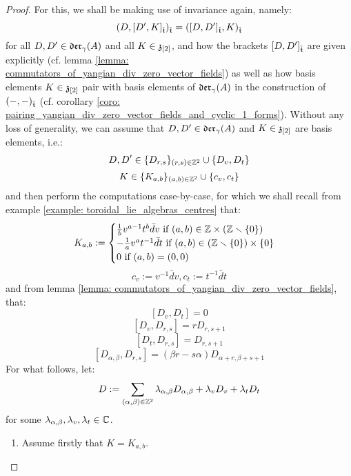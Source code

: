             \begin{proof}
                For this, we shall be making use of invariance again, namely:
                    $$(D, [D', K]_{\hat{\mathfrak{t}}})_{\hat{\mathfrak{t}}} = ([D, D']_{\hat{\mathfrak{t}}}, K)_{\hat{\mathfrak{t}}}$$
                for all $D, D' \in \mathfrak{der}_{\gamma}(A)$ and all $K \in \mathfrak{z}_{[2]}$, and how the brackets $[D, D']_{\hat{\mathfrak{t}}}$ are given explicitly (cf. lemma \ref{lemma: commutators_of_yangian_div_zero_vector_fields}) as well as how basis elements $K \in \mathfrak{z}_{[2]}$ pair with basis elements of $\mathfrak{der}_{\gamma}(A)$ in the construction of $(-, -)_{\hat{\mathfrak{t}}}$ (cf. corollary \ref{coro: pairing_yangian_div_zero_vector_fields_and_cyclic_1_forms}). Without any loss of generality, we can assume that $D, D' \in \mathfrak{der}_{\gamma}(A)$ and $K \in \mathfrak{z}_{[2]}$ are basis elements, i.e.:
                    $$D, D' \in \{D_{r, s}\}_{(r, s) \in \mathbb{Z}^2} \cup \{D_v, D_t\}$$
                    $$K \in \{K_{a, b}\}_{(a, b) \in \mathbb{Z}^2} \cup \{c_v, c_t\}$$
                and then perform the computations case-by-case, for which we shall recall from example \ref{example: toroidal_lie_algebras_centres} that:
                    $$
                        K_{a, b} :=
                        \begin{cases}
                            \text{$\frac1b v^{a - 1} t^b \bar{d}v$ if $(a, b) \in \Z \x (\Z \setminus \{0\})$}
                            \\
                            \text{$-\frac1a v^a t^{-1} \bar{d}t$ if $(a, b) \in (\Z \setminus \{0\}) \x \{0\}$}
                            \\
                            \text{$0$ if $(a, b) = (0, 0)$}
                        \end{cases}
                    $$
                    $$c_v := v^{-1} \bar{d}v, c_t := t^{-1} \bar{d}t$$
                and from lemma \ref{lemma: commutators_of_yangian_div_zero_vector_fields}, that:
                    $$[D_v, D_t] = 0$$
                    $$[D_v, D_{r, s}] = r D_{r, s + 1}$$
                    $$[D_t, D_{r, s}] = D_{r, s + 1}$$
                    $$[D_{\alpha, \beta}, D_{r, s}] = (\beta r - s \alpha) D_{\alpha + r, \beta + s + 1}$$
                For what follows, let:
                    $$D := \sum_{(\alpha, \beta) \in \mathbb{Z}^2} \lambda_{\alpha, \beta} D_{\alpha, \beta} + \lambda_v D_v + \lambda_t D_t$$
                for some $\lambda_{\alpha, \beta}, \lambda_v, \lambda_t \in \mathbb{C}$.
                \begin{enumerate}
                    \item Assume firstly that $K = K_{a, b}$.

\end{enumerate}
\end{proof}

